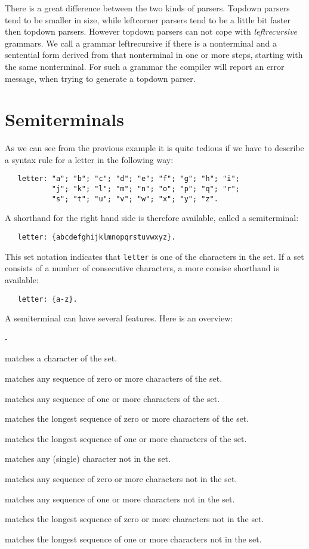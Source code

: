 There is a great difference between the two kinds of parsers.
Topdown parsers tend to be smaller in size, while leftcorner
parsers tend to be a little bit faster then topdown parsers.
However topdown parsers can not cope with {\em leftrecursive}
grammars. We call a grammar leftrecursive if there is a nonterminal
and a sentential form derived from that nonterminal in one or
more steps, starting with the same nonterminal. For such a grammar
the \EAG compiler will report an error message, when trying to
generate a topdown parser.
\section {Semiterminals}
As we can see from the provious example it is quite tedious
if we have to describe a syntax rule for a letter in the following way:
\begin{verbatim}
   letter: "a"; "b"; "c"; "d"; "e"; "f"; "g"; "h"; "i";
           "j"; "k"; "l"; "m"; "n"; "o"; "p"; "q"; "r";
           "s"; "t"; "u"; "v"; "w"; "x"; "y"; "z".
\end{verbatim}
A shorthand for the right hand side is therefore available,
called a semiterminal:
\begin{verbatim}
   letter: {abcdefghijklmnopqrstuvwxyz}.
\end{verbatim}
This set notation indicates that \verb+letter+ is one of the characters
in the set. If a set consists of a number of consecutive characters,
a more consise shorthand is available:
\begin{verbatim}
   letter: {a-z}.
\end{verbatim}
A semiterminal can have several features. Here is an overview:
\begin {list}{-}
{\setlength {\leftmargin}{7em}
\setlength {\labelwidth}{5em}
\setlength {\itemsep}{0.3ex}}
\item [{\tt \{....\}}]
matches a character of the set.
\item [{\tt \{....\}*}]
matches any sequence of zero or more characters of the set.
\item [{\tt \{....\}+}]
matches any sequence of one or more characters of the set.
\item [{\tt \{....\}*!}]
matches the longest sequence of zero or more characters of the set.
\item [{\tt \{....\}+!}]
matches the longest sequence of one or more characters of the set.
\item [{\tt \^{ }\{....\}}]
matches any (single) character not in the set.
\item [{\tt \^{ }\{....\}*}]
matches any sequence of zero or more characters not in the set.
\item [{\tt \^{ }\{....\}+}]
matches any sequence of one or more characters not in the set.
\item [{\tt \^{ }\{....\}*!}]
matches the longest sequence of zero or more characters not in the set.
\item [{\tt \^{ }\{....\}+!}]
matches the longest sequence of one or more characters not in the set.
\end {list}
